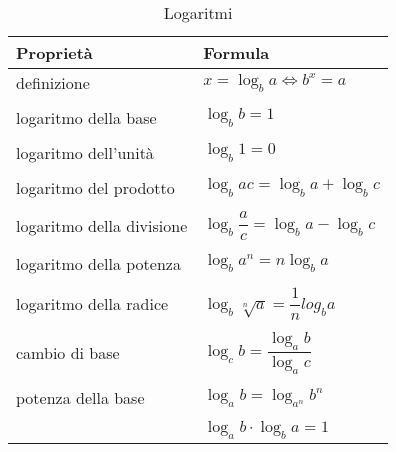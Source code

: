 \begin{table}
\centering
\begin{tabular}{ll}
\toprule
Proprietà&Formula\\
\midrule
definizione&$x=\log_ba\Leftrightarrow b^{x}=a$\\
&\\
logaritmo della base&$\log_bb=1$\\
&\\
logaritmo dell'unità&$\log_b1=0$\\
&\\
logaritmo del prodotto&$\log_bac=\log_ba+\log_bc$\\
&\\
logaritmo della divisione&$\log_b\dfrac{a}{c}=\log_ba-\log_bc$\\
&\\
logaritmo della potenza&$\log_ba^{n}=n\log_ba$\\
&\\
logaritmo della radice&$\log_b\sqrt[n]{a}=\dfrac{1}{n}log_ba$\\
&\\
cambio di base&$\log_cb=\dfrac{\log_ab}{\log_ac}$\\
&\\
potenza della base&$\log_ab=\log_{a^n}b^{n}$\\
&\\
&$\log_ab\cdot\log_ba=1$\\
\bottomrule
\end{tabular}
\caption{Logaritmi}
\label{tab:logaritmi}
\end{table}
